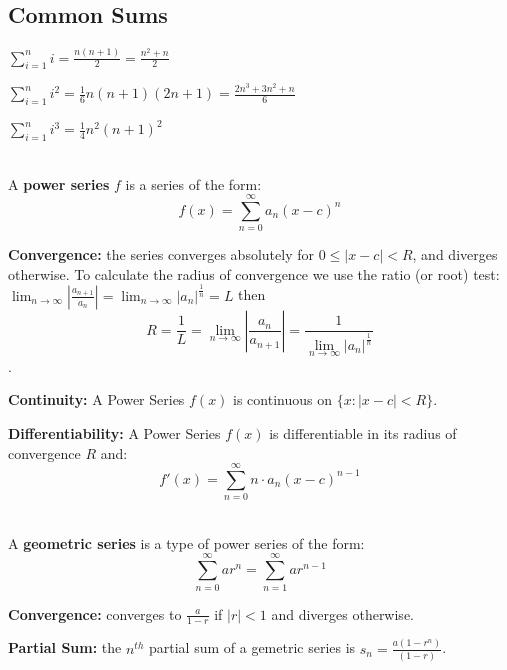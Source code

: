 \documentclass[8pt,a4paper]{extarticle}     %
\theoremstyle{definition}
\theoremstyle{definition}
\theoremstyle{definition}
\begin{document}
\begin{multicols}{4}
\subsection{Common Sums}
\begin{eqlist}
	\item $\sum_{i=1}^n i = \frac{n(n+1)}{2} = \frac{n^2+n}{2}$
	\item $\sum_{i=1}^n i^2 = \frac{1}{6} n(n+1)(2n+1) = \frac{2n^3+3n^2+n}{6}$
	\item $\sum_{i=1}^n i^3 = \frac{1}{4} n^2(n+1)^2$
\end{eqlist}
\begin{boxdefinition} \ \\
	A \textbf{power series} $f$ is a series of the form:
	$$f(x) = \sum_{n=0}^\infty a_n(x-c)^n$$
	\begin{bulletlist}
		\item \textbf{Convergence:} the series converges absolutely for $0\leq|x-c|<R$, and diverges otherwise. To calculate the radius of convergence we use the ratio (or root) test: $\lim_{n\to\infty}\left|\frac{a_{n+1}}{a_n}\right| = \lim_{n\to\infty} \left|a_n\right|^\frac{1}{n} = L$ then $$R = \frac{1}{L} = \lim_{n\to\infty}\left|\frac{a_n}{a_{n+1}}\right| = \frac{1}{\lim_{n\to\infty}\left|a_n\right|^\frac{1}{n}} $$.
	\end{bulletlist}
\end{boxdefinition}

\begin{eqlist}
	\item \textbf{Continuity:} A Power Series $f(x)$ is continuous on $\{x: |x-c| < R\}$.
	\item \textbf{Differentiability:} A Power Series $f(x)$ is differentiable in its radius of convergence $R$ and:
	$$f'(x) = \sum_{n=0}^\infty n\cdot a_n(x-c)^{n-1}$$
\end{eqlist}

\begin{boxdefinition} \ \\
	A \textbf{geometric series} is a type of power series of the form:
	$$\sum_{n=0}^\infty ar^n = \sum_{n=1}^\infty ar^{n-1}$$
	\begin{bulletlist}
		\item \textbf{Convergence:} converges to $\frac{a}{1-r}$ if $|r|<1$ and diverges otherwise.
		\item \textbf{Partial Sum:} the $n^{th}$ partial sum of a gemetric series is $s_n=\frac{a(1-r^n)}{(1-r)}$.
	\end{bulletlist}
\end{boxdefinition}


\end{multicols}
\end{document}
